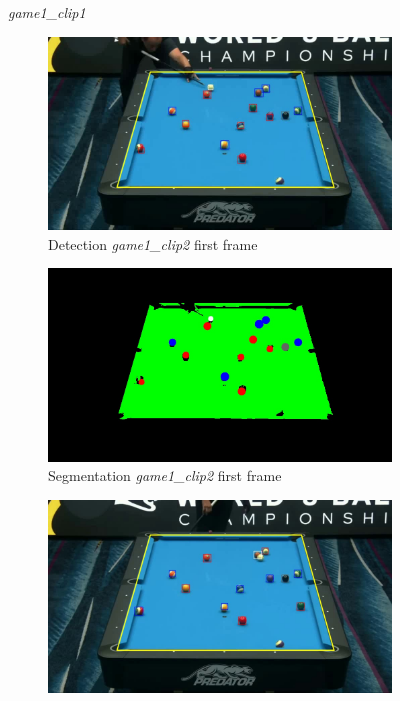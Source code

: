 \begin{figure}[H]
	\caption{\textit{game1\_clip1}}
\end{figure}

\begin{figure}[H]
	\centering
	\begin{subfigure}[b]{0.48\textwidth}
		\centering
		\includegraphics[width=\textwidth]{images/Detection/game1_clip2_detected_balls_first_frame.jpg}
		\caption{Detection \textit{game1\_clip2} first frame}
		\label{fig: game1_clip2_first_frame_detected}
	\end{subfigure}
	\begin{subfigure}[b]{0.48\textwidth}
		\centering
		\includegraphics[width=\textwidth]{images/Segmentation/game1_clip2_segmented_balls_first_frame.jpg}
		\caption{Segmentation \textit{game1\_clip2} first frame}
		\label{fig: game1_clip2_first_frame_segmented}
	\end{subfigure}
	\begin{subfigure}[b]{0.48\textwidth}
		\centering
		\includegraphics[width=\textwidth]{images/Detection/game1_clip2_detected_balls_last_frame.jpg}

\end{subfigure}
\end{figure}
